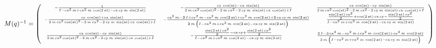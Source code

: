 \documentclass[fleqn, a4paper, 12pt, russian]{article}
\begin{document}
\begin{landscape}
$\tiny{M(q)^{-1}=
	\left(\begin{array}{ccc} -\frac{1}{I-{\mathrm{cx}}^2\,m+{\mathrm{cx}}^2\,m\,\cos\left(2\,\mathrm{at}\right)-\mathrm{cx}\,\mathrm{cy}\,m\,\sin\left(2\,\mathrm{at}\right)} & -\frac{\mathrm{cy}\,\cos\left(\mathrm{at}\right)-\mathrm{cx}\,\sin\left(\mathrm{at}\right)}{2\,m\,{\mathrm{cx}}^2\,{\cos\left(\mathrm{at}\right)}^2-2\,m\,{\mathrm{cx}}^2-2\,\mathrm{cy}\,m\,\sin\left(\mathrm{at}\right)\,\mathrm{cx}\,\cos\left(\mathrm{at}\right)+I} & \frac{\mathrm{cx}\,\cos\left(\mathrm{at}\right)-\mathrm{cy}\,\sin\left(\mathrm{at}\right)}{2\,m\,{\mathrm{cx}}^2\,{\cos\left(\mathrm{at}\right)}^2-2\,m\,{\mathrm{cx}}^2-2\,\mathrm{cy}\,m\,\sin\left(\mathrm{at}\right)\,\mathrm{cx}\,\cos\left(\mathrm{at}\right)+I}\\ -\frac{\mathrm{cy}\,\cos\left(\mathrm{at}\right)+\mathrm{cx}\,\sin\left(\mathrm{at}\right)}{2\,m\,{\mathrm{cx}}^2\,{\cos\left(\mathrm{at}\right)}^2-2\,m\,{\mathrm{cx}}^2-2\,\mathrm{cy}\,m\,\sin\left(\mathrm{at}\right)\,\mathrm{cx}\,\cos\left(\mathrm{at}\right)+I} & -\frac{{\mathrm{cx}}^2\,m-2\,I+{\mathrm{cy}}^2\,m-{\mathrm{cx}}^2\,m\,\cos\left(2\,\mathrm{at}\right)+{\mathrm{cy}}^2\,m\,\cos\left(2\,\mathrm{at}\right)+2\,\mathrm{cx}\,\mathrm{cy}\,m\,\sin\left(2\,\mathrm{at}\right)}{2\,m\,\left(I-{\mathrm{cx}}^2\,m+{\mathrm{cx}}^2\,m\,\cos\left(2\,\mathrm{at}\right)-\mathrm{cx}\,\mathrm{cy}\,m\,\sin\left(2\,\mathrm{at}\right)\right)} & \frac{\frac{\sin\left(2\,\mathrm{at}\right)\,{\mathrm{cx}}^2}{2}+\cos\left(2\,\mathrm{at}\right)\,\mathrm{cx}\,\mathrm{cy}-\frac{\sin\left(2\,\mathrm{at}\right)\,{\mathrm{cy}}^2}{2}}{I-{\mathrm{cx}}^2\,m+{\mathrm{cx}}^2\,m\,\cos\left(2\,\mathrm{at}\right)-\mathrm{cx}\,\mathrm{cy}\,m\,\sin\left(2\,\mathrm{at}\right)}\\ \frac{\mathrm{cx}\,\cos\left(\mathrm{at}\right)-\mathrm{cy}\,\sin\left(\mathrm{at}\right)}{2\,m\,{\mathrm{cx}}^2\,{\cos\left(\mathrm{at}\right)}^2-2\,m\,{\mathrm{cx}}^2-2\,\mathrm{cy}\,m\,\sin\left(\mathrm{at}\right)\,\mathrm{cx}\,\cos\left(\mathrm{at}\right)+I} & -\frac{\frac{\sin\left(2\,\mathrm{at}\right)\,{\mathrm{cx}}^2}{2}-\mathrm{cx}\,\mathrm{cy}+\frac{\sin\left(2\,\mathrm{at}\right)\,{\mathrm{cy}}^2}{2}}{I-{\mathrm{cx}}^2\,m+{\mathrm{cx}}^2\,m\,\cos\left(2\,\mathrm{at}\right)-\mathrm{cx}\,\mathrm{cy}\,m\,\sin\left(2\,\mathrm{at}\right)} & \frac{2\,I-3\,{\mathrm{cx}}^2\,m-{\mathrm{cy}}^2\,m+{\mathrm{cx}}^2\,m\,\cos\left(2\,\mathrm{at}\right)+{\mathrm{cy}}^2\,m\,\cos\left(2\,\mathrm{at}\right)}{2\,m\,\left(I-{\mathrm{cx}}^2\,m+{\mathrm{cx}}^2\,m\,\cos\left(2\,\mathrm{at}\right)-\mathrm{cx}\,\mathrm{cy}\,m\,\sin\left(2\,\mathrm{at}\right)\right)} \end{array}\right)
}$


\end{landscape}
\end{document}
